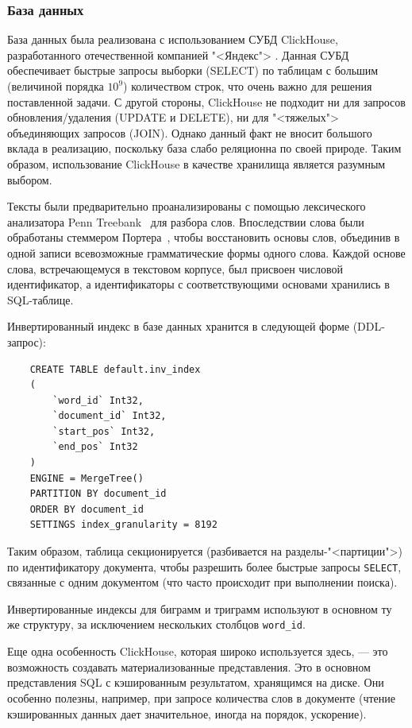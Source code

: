 \subsubsection{База данных}
База данных была реализована с использованием СУБД ClickHouse, разработанного отечественной компанией "<Яндекс">
\cite{Clickhouse2020}. Данная СУБД обеспечивает быстрые запросы выборки (SELECT) по таблицам с большим (величиной порядка $10^9$)
количеством строк, что очень важно для решения поставленной задачи. С другой стороны, ClickHouse не подходит ни для запросов
обновления/удаления (UPDATE и DELETE), ни для "<тяжелых"> объединяющих запросов (JOIN). Однако данный факт 
не вносит большого вклада в реализацию, поскольку база слабо реляционна по своей природе. Таким образом, использование 
ClickHouse в качестве хранилища является разумным выбором.

Тексты были предварительно проанализированы с помощью лексического анализатора Penn Treebank~\cite{10.3115/1075812.1075835}
для разбора слов. Впоследствии слова были обработаны стеммером Портера~\cite{Porter1980AnAF}, чтобы восстановить основы слов, 
объединив в одной записи всевозможные грамматические формы одного слова.
Каждой основе слова, встречающемуся в текстовом корпусе, был присвоен числовой идентификатор, а идентификаторы 
с соответствующими основами хранились в SQL-таблице.

Инвертированный индекс в базе данных хранится в следующей форме (DDL-запрос):

\begin{verbatim}
    CREATE TABLE default.inv_index
    (
        `word_id` Int32,
        `document_id` Int32,
        `start_pos` Int32,
        `end_pos` Int32
    )
    ENGINE = MergeTree()
    PARTITION BY document_id
    ORDER BY document_id
    SETTINGS index_granularity = 8192
\end{verbatim}

Таким образом, таблица секционируется (разбивается на разделы-"<партиции">) по идентификатору документа, чтобы разрешить
более быстрые запросы \texttt{SELECT}, связанные с одним документом (что часто происходит при выполнении поиска).

Инвертированные индексы для биграмм и триграмм используют в основном ту же структуру, за исключением нескольких столбцов
\texttt{word\_id}.

Еще одна особенность ClickHouse, которая широко используется здесь, --- это возможность создавать материализованные представления.
Это в основном представления SQL с кэшированным результатом, хранящимся на диске. Они особенно полезны, например, при запросе
количества слов в документе (чтение кэшированных данных дает значительное, иногда на порядок, ускорение).

